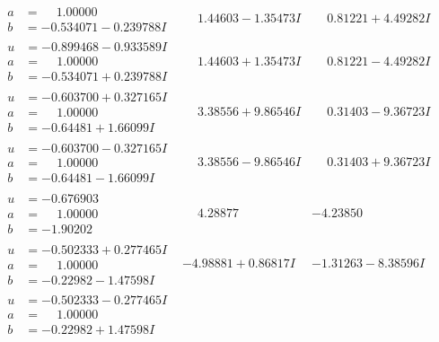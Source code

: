 \documentclass[1p]{elsarticle_modified}
\theoremstyle{definition}
\begin{document}
$$\begin{array}{c|c|c}
\begin{aligned}
a &= \phantom{-}1.00000\phantom{ +0.000000I} \\
b &= -0.534071 - 0.239788 I\end{aligned}
 & \phantom{-}1.44603 - 1.35473 I & \phantom{-}0.81221 + 4.49282 I \\ \hline\begin{aligned}
u &= -0.899468 - 0.933589 I \\
a &= \phantom{-}1.00000\phantom{ +0.000000I} \\
b &= -0.534071 + 0.239788 I\end{aligned}
 & \phantom{-}1.44603 + 1.35473 I & \phantom{-}0.81221 - 4.49282 I \\ \hline\begin{aligned}
u &= -0.603700 + 0.327165 I \\
a &= \phantom{-}1.00000\phantom{ +0.000000I} \\
b &= -0.64481 + 1.66099 I\end{aligned}
 & \phantom{-}3.38556 + 9.86546 I & \phantom{-}0.31403 - 9.36723 I \\ \hline\begin{aligned}
u &= -0.603700 - 0.327165 I \\
a &= \phantom{-}1.00000\phantom{ +0.000000I} \\
b &= -0.64481 - 1.66099 I\end{aligned}
 & \phantom{-}3.38556 - 9.86546 I & \phantom{-}0.31403 + 9.36723 I \\ \hline\begin{aligned}
u &= -0.676903\phantom{ +0.000000I} \\
a &= \phantom{-}1.00000\phantom{ +0.000000I} \\
b &= -1.90202\phantom{ +0.000000I}\end{aligned}
 & \phantom{-}4.28877\phantom{ +0.000000I} & -4.23850\phantom{ +0.000000I} \\ \hline\begin{aligned}
u &= -0.502333 + 0.277465 I \\
a &= \phantom{-}1.00000\phantom{ +0.000000I} \\
b &= -0.22982 - 1.47598 I\end{aligned}
 & -4.98881 + 0.86817 I & -1.31263 - 8.38596 I \\ \hline\begin{aligned}
u &= -0.502333 - 0.277465 I \\
a &= \phantom{-}1.00000\phantom{ +0.000000I} \\
b &= -0.22982 + 1.47598 I\end{aligned}

\end{array}$$
\end{document}
